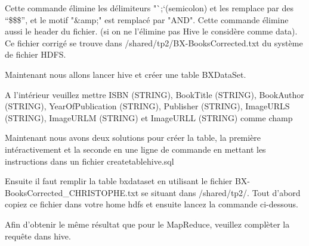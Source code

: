 \documentclass[11pt]{article}
\begin{document}
Cette commande élimine les délimiteurs "`;`(semicolon) et les remplace par des ``\$\$\$'', et le motif "\&amp;" est remplacé par "AND". Cette commande élimine aussi le header du fichier.
(si on ne l'élimine pas Hive le considère comme data). Ce fichier corrigé se trouve dans /shared/tp2/BX-BooksCorrected.txt du système de fichier HDFS.



Maintenant nous allons lancer hive et créer une table BXDataSet.

A l'intérieur veuillez mettre ISBN (STRING), BookTitle (STRING), BookAuthor (STRING), YearOfPublication (STRING), Publisher (STRING), ImageURLS (STRING), ImageURLM (STRING) et ImageURLL (STRING) comme champ


%



Maintenant nous avons deux solutions pour créer la table, la première intéractivement et la seconde en une ligne de commande en mettant les instructions dans un fichier createtablehive.sql 


Ensuite il faut remplir la table bxdataset en utilisant le fichier BX-BooksCorrected\_CHRISTOPHE.txt se situant dans /shared/tp2/. Tout d'abord copiez ce fichier dans votre home hdfs et ensuite lancez
la commande ci-dessous.



Afin d'obtenir le même résultat que pour le MapReduce, veuillez complèter la requête dans hive.


%
\end{document}
